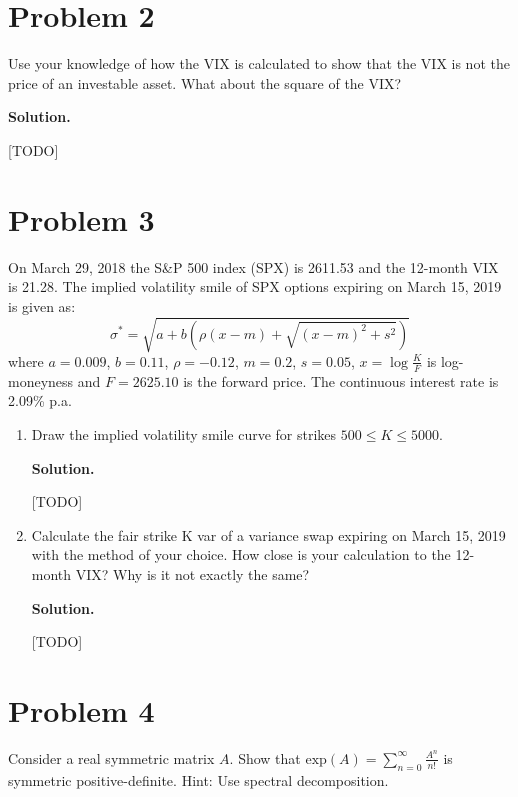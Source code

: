 \documentclass[12pt]{article}
\newcommand{\Exp}[1]{\text{exp}(#1)}
\newenvironment{solution}{\vspace{0.2cm} \textbf{Solution.}}{}
\begin{document}
\newpage

	\section*{Problem 2}
Use your knowledge of how the VIX is calculated to show that the VIX is not the price of an investable asset. What about the square of the VIX?

\begin{solution}

[TODO]
	
\end{solution}

\newpage
	
	\section*{Problem 3}
On March 29, 2018 the S\&P 500 index (SPX) is 2611.53 and the 12-month VIX is 21.28. The implied volatility smile of SPX options expiring on March 15, 2019 is given as:
$$ \sigma^* = \sqrt{a + b \left( \rho (x - m)  + \sqrt{(x-m)^2 + s^2} \right)} $$
where $a = 0.009$, $b = 0.11$, $\rho = −0.12$, $m = 0.2$, $s = 0.05$, $x = \log \frac{K}{F}$ is log-moneyness and $F = 2625.10$ is the forward price. The continuous interest rate is 2.09\% p.a.

	\begin{enumerate}[label=(\alph*)]
	\item Draw the implied volatility smile curve for strikes $500 \leq K \leq 5000$.
	
	\begin{solution}
	
	[TODO]
	\end{solution}
	
	\item Calculate the fair strike K var of a variance swap expiring on March 15, 2019 with the method of your choice. How close is your calculation to the 12-month VIX? Why is it not exactly the same?
	
	\begin{solution}
	
	[TODO]
	\end{solution}	

	\end{enumerate}

\newpage

	\section*{Problem 4}
Consider a real symmetric matrix $A$. Show that $\Exp{A} = \sum_{n=0}^{\infty} \frac{A^n}{n!}$ is symmetric positive-definite.
Hint: Use spectral decomposition.
\end{document}

